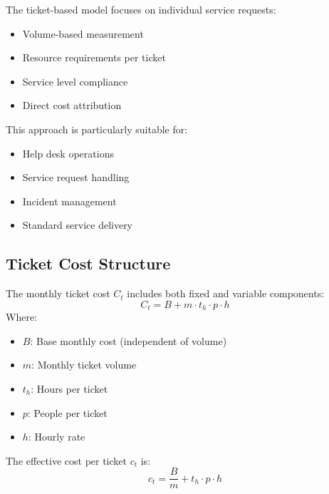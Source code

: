 \documentclass[12pt,a4paper]{article}
\newenvironment{definition}[1]
{\begin{mdframed}[style=definitionstyle,frametitle={Definition: #1}]}
{\end{mdframed}}
\newenvironment{explanation}
{\begin{mdframed}[style=explanationstyle,frametitle={Explanation}]}
{\end{mdframed}}
\begin{document}
\begin{explanation}
The ticket-based model focuses on individual service requests:
\begin{itemize}
    \item Volume-based measurement
    \item Resource requirements per ticket
    \item Service level compliance
    \item Direct cost attribution
\end{itemize}

This approach is particularly suitable for:
\begin{itemize}
    \item Help desk operations
    \item Service request handling
    \item Incident management
    \item Standard service delivery
\end{itemize}
\end{explanation}

\subsection{Ticket Cost Structure}

\begin{definition}{Base Ticket Cost}
The monthly ticket cost $C_t$ includes both fixed and variable components:
\begin{equation}
    C_t = B + m \cdot t_h \cdot p \cdot h
\end{equation}
Where:
\begin{itemize}
    \item $B$: Base monthly cost (independent of volume)
    \item $m$: Monthly ticket volume
    \item $t_h$: Hours per ticket
    \item $p$: People per ticket
    \item $h$: Hourly rate
\end{itemize}

The effective cost per ticket $c_t$ is:
\begin{equation}
    c_t = \frac{B}{m} + t_h \cdot p \cdot h
\end{equation}
\end{definition}
\end{document}
